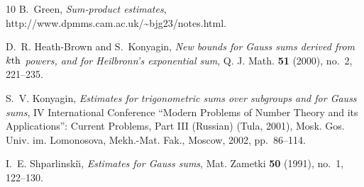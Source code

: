 \documentclass[11pt]{amsart}
\begin{document}
\begin{thebibliography}{10}
B.~Green, \emph{Sum-product estimates}, 
  http://www.dpmms.cam.ac.uk/\~{ }bjg23/notes.html.

D.~R. Heath-Brown and S.~Konyagin, \emph{New bounds for {G}auss sums derived
  from {$k{\rm th}$} powers, and for {H}eilbronn's exponential sum}, Q. J.
  Math. \textbf{51} (2000), no.~2, 221--235. 

S.~V. Konyagin, \emph{Estimates for trigonometric sums over subgroups and for
  {G}auss sums}, IV International Conference ``Modern Problems of Number Theory
  and its Applications'': Current Problems, Part III (Russian) (Tula, 2001),
  Mosk. Gos. Univ. im. Lomonosova, Mekh.-Mat. Fak., Moscow, 2002, pp.~86--114.

I.~E. Shparlinski{\u\i}, \emph{Estimates for {G}auss sums}, Mat. Zametki
  \textbf{50} (1991), no.~1, 122--130. 

\end{thebibliography}
\end{document}
